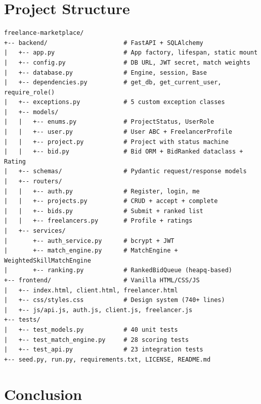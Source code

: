 \documentclass[12pt, a4paper]{report}
\begin{document}
\chapter{Project Structure}

\begin{lstlisting}[style=bashstyle, caption={Complete project file tree (41 files)}]
freelance-marketplace/
+-- backend/                     # FastAPI + SQLAlchemy
|   +-- app.py                   # App factory, lifespan, static mount
|   +-- config.py                # DB URL, JWT secret, match weights
|   +-- database.py              # Engine, session, Base
|   +-- dependencies.py          # get_db, get_current_user, require_role()
|   +-- exceptions.py            # 5 custom exception classes
|   +-- models/
|   |   +-- enums.py             # ProjectStatus, UserRole
|   |   +-- user.py              # User ABC + FreelancerProfile
|   |   +-- project.py           # Project with status machine
|   |   +-- bid.py               # Bid ORM + BidRanked dataclass + Rating
|   +-- schemas/                 # Pydantic request/response models
|   +-- routers/
|   |   +-- auth.py              # Register, login, me
|   |   +-- projects.py          # CRUD + accept + complete
|   |   +-- bids.py              # Submit + ranked list
|   |   +-- freelancers.py       # Profile + ratings
|   +-- services/
|       +-- auth_service.py      # bcrypt + JWT
|       +-- match_engine.py      # MatchEngine + WeightedSkillMatchEngine
|       +-- ranking.py           # RankedBidQueue (heapq-based)
+-- frontend/                    # Vanilla HTML/CSS/JS
|   +-- index.html, client.html, freelancer.html
|   +-- css/styles.css           # Design system (740+ lines)
|   +-- js/api.js, auth.js, client.js, freelancer.js
+-- tests/
|   +-- test_models.py           # 40 unit tests
|   +-- test_match_engine.py     # 28 scoring tests
|   +-- test_api.py              # 23 integration tests
+-- seed.py, run.py, requirements.txt, LICENSE, README.md
\end{lstlisting}

\chapter{Conclusion}
\end{document}
